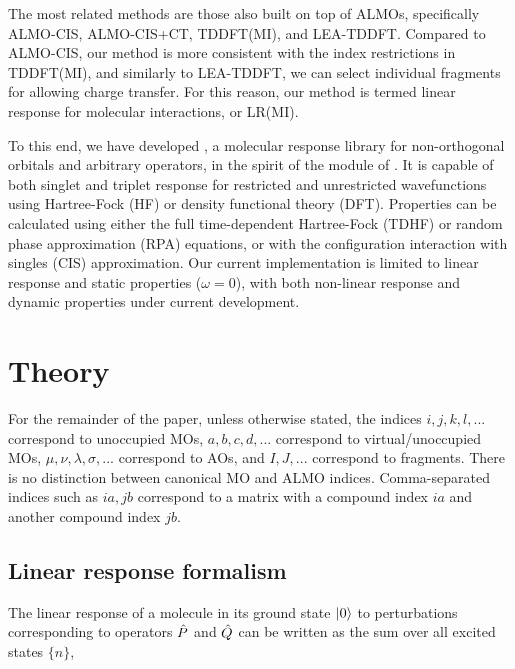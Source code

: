 The most related methods are those also built on top of ALMOs, specifically ALMO-CIS\cite{Closser_2015_5791}, ALMO-CIS+CT\cite{Ge_2017_44111}, TDDFT(MI)\cite{doi:10.1063/1.4926837}, and LEA-TDDFT\cite{doi:10.1021/acs.jctc.5b00828}. Compared to ALMO-CIS, our method is more consistent with the index restrictions in TDDFT(MI), and similarly to LEA-TDDFT, we can select individual fragments for allowing charge transfer. For this reason, our method is termed linear response for molecular interactions, or LR(MI).

To this end, we have developed \libresponse{}, a molecular response library for non-orthogonal orbitals and arbitrary operators, in the spirit of the \response{} module of \pdalton{}\cite{daltonpaper}. It is capable of both singlet\cite{doi:10.1063/1.454885} and triplet\cite{doi:10.1063/1.457471} response for restricted and unrestricted wavefunctions using Hartree-Fock (HF) or density functional theory (DFT). Properties can be calculated using either the full time-dependent Hartree-Fock (TDHF) or random phase approximation (RPA) equations, or with the configuration interaction with singles (CIS) approximation\cite{doi:10.1021/j100180a030}. Our current implementation is limited to linear response and static properties (\(\omega = 0\)), with both non-linear response and dynamic properties under current development.

\section{Theory}
\label{sec:theory}

For the remainder of the paper, unless otherwise stated, the indices \(i,j,k,l,...\) correspond to unoccupied MOs, \(a,b,c,d,...\) correspond to virtual/unoccupied MOs, \(\mu,\nu,\lambda,\sigma,...\) correspond to AOs, and \(I,J,...\) correspond to fragments. There is no distinction between canonical MO and ALMO indices. Comma-separated indices such as \(ia,jb\) correspond to a matrix with a compound index \(ia\) and another compound index \(jb\).

\subsection{Linear response formalism}
\label{ssec:linear-response-formalism}

The linear response of a molecule in its ground state \(\ket{0}\) to perturbations corresponding to operators \(\hat{P}\) and \(\hat{Q}\) can be written as the sum over all excited states \(\{n\}\),

